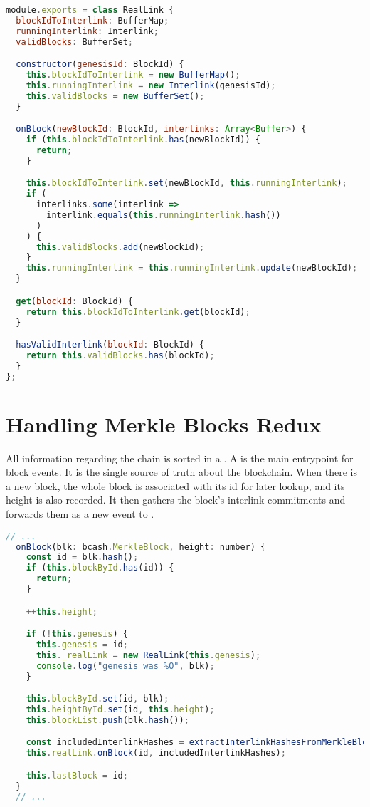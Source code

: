\begin{lstlisting}[language=Javascript]
module.exports = class RealLink {
  blockIdToInterlink: BufferMap;
  runningInterlink: Interlink;
  validBlocks: BufferSet;

  constructor(genesisId: BlockId) {
    this.blockIdToInterlink = new BufferMap();
    this.runningInterlink = new Interlink(genesisId);
    this.validBlocks = new BufferSet();
  }

  onBlock(newBlockId: BlockId, interlinks: Array<Buffer>) {
    if (this.blockIdToInterlink.has(newBlockId)) {
      return;
    }

    this.blockIdToInterlink.set(newBlockId, this.runningInterlink);
    if (
      interlinks.some(interlink =>
        interlink.equals(this.runningInterlink.hash())
      )
    ) {
      this.validBlocks.add(newBlockId);
    }
    this.runningInterlink = this.runningInterlink.update(newBlockId);
  }

  get(blockId: BlockId) {
    return this.blockIdToInterlink.get(blockId);
  }

  hasValidInterlink(blockId: BlockId) {
    return this.validBlocks.has(blockId);
  }
};
\end{lstlisting}

\section{Handling Merkle Blocks Redux}
All information regarding the chain is sorted in a . A  is the main entrypoint for block events. It is the single source of truth about the blockchain. When there is a new block, the whole block is associated with its id for later lookup, and its height is also recorded. It then gathers the block's interlink commitments and forwards them as a new event to .

\begin{lstlisting}[language=Javascript]
  // ...
  onBlock(blk: bcash.MerkleBlock, height: number) {
    const id = blk.hash();
    if (this.blockById.has(id)) {
      return;
    }

    ++this.height;

    if (!this.genesis) {
      this.genesis = id;
      this._realLink = new RealLink(this.genesis);
      console.log("genesis was %O", blk);
    }

    this.blockById.set(id, blk);
    this.heightById.set(id, this.height);
    this.blockList.push(blk.hash());

    const includedInterlinkHashes = extractInterlinkHashesFromMerkleBlock(blk);
    this.realLink.onBlock(id, includedInterlinkHashes);

    this.lastBlock = id;
  }
  // ...
\end{lstlisting}

